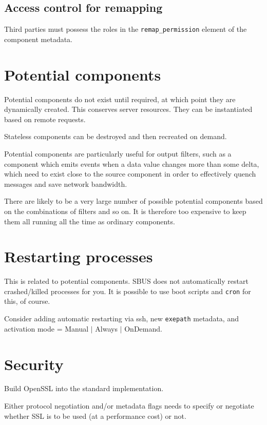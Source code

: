 \documentclass[12pt,a4paper,twoside]{article}
\renewcommand{\_}{\texttt{\symbol{95}}}
\begin{document}
\subsection*{Access control for remapping}

Third parties must possess the roles in the \verb^remap_permission^
element of the component metadata.

\section{Potential components}

Potential components do not exist until required, at which point
they are dynamically created. This conserves server resources.
They can be instantiated based on remote requests.

Stateless components can be destroyed and then
recreated on demand.

Potential components are particularly useful for output filters,
such as a component which emits events when a data value changes
more than some delta, which need to exist close to the
source component in order to effectively quench messages and
save network bandwidth.

There are likely to be a very large number of possible potential
components based on the combinations of filters and so on.
It is therefore too expensive to keep them all running all the
time as ordinary components.

\section{Restarting processes}

This is related to potential components.
SBUS does not automatically restart crashed/killed processes for you.
It is possible to use boot scripts and \texttt{cron} for this, of course.

Consider adding automatic restarting via ssh, new \texttt{exe\_path} metadata,
and activation mode = Manual $|$ Always $|$ OnDemand.

\section{Security}

Build OpenSSL into the standard implementation.

Either protocol negotiation and/or metadata flags needs to specify
or negotiate whether SSL is to be used (at a performance cost)
or not.
\end{document}
